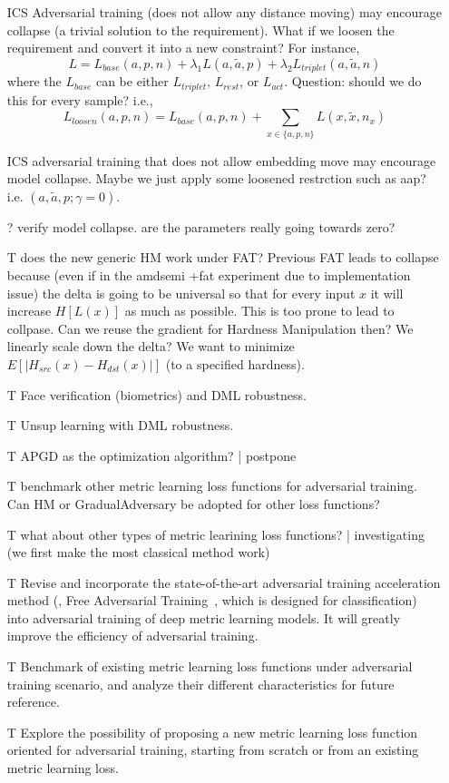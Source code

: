 \begin{itemize}
	\item [ICS] Adversarial training (does not allow any distance moving) may
		encourage collapse (a trivial solution to the requirement). What if we
		loosen the requirement and convert it into a new constraint? For
		instance, \[
			L=L_{base}(a,p,n)+\lambda_{1}L(a,\tilde{a},p)+\lambda_{2}L_{triplet}(a,\tilde{a},n)
		\] where the $L_{base}$ can be either $L_{triplet}$, $L_{rest}$, or
		$L_{act}$. Question: should we do this for every sample? i.e., \[
			L_{loosen}(a,p,n)=L_{base}(a,p,n)+\sum_{x\in\{a,p,n\}}L(x,\tilde{x},n_{x})
		\]

	\item [ICS] adversarial training that does not allow embedding move may
		encourage model collapse. Maybe we just apply some loosened restrction
		such as aap? i.e. $(a,\tilde{a},p;\gamma=0)$.

	\item [?] verify model collapse. are the parameters really going towards zero?

	\item [T] does the new generic HM work under FAT?
		Previous FAT leads to collapse because (even if in the amdsemi +fat
		experiment due to implementation issue) the delta is going to be universal
		so that for every input $x$ it will increase $H[L(x)]$ as much as possible.
		This is too prone to lead to collpase. Can we reuse the gradient for 
		Hardness Manipulation then? We linearly scale down the delta?
		We want to minimize $E[|H_{src}(x)-H_{dst}(x)|]$ (to a specified hardness).

	\item [T] Face verification (biometrics) and DML robustness.

	\item [T] Unsup learning with DML robustness.

	\item [T] APGD as the optimization algorithm? | postpone

	\item [T] benchmark other metric learning loss functions for adversarial
		training. Can HM or GradualAdversary be adopted for other loss functions?

	\item [T]  what about other types of metric learining loss functions? |
		investigating (we first make the most classical method work)

	\item [T] Revise and incorporate the state-of-the-art adversarial training
		acceleration method (\ie, Free Adversarial Training~\cite{freeat},
		which is designed for classification) into adversarial training of 
		deep metric learning models. It will greatly improve the efficiency
		of adversarial training.
	\item [T] Benchmark of existing metric learning loss functions under
		adversarial training scenario, and analyze their different
		characteristics for future reference.
	\item [T] Explore the possibility of proposing a new metric learning loss
		function oriented for adversarial training, starting from scratch or
		from an existing metric learning loss.
\end{itemize}

